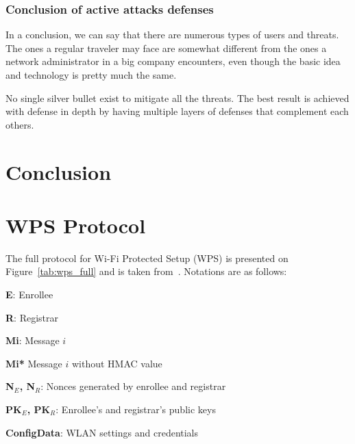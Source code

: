 \documentclass[12pt,a4paper,oneside,pdftex]{report}
\begin{document}
\subsection{Conclusion of active attacks defenses}

In a conclusion, we can say that there are numerous types of users and threats. The ones a regular traveler may face are somewhat different from the ones a network administrator in a big company encounters, even though the basic idea and technology is pretty much the same.

No single silver bullet exist to mitigate all the threats. The best result is achieved with defense in depth by having multiple layers of defenses that complement each others. 




\chapter{Conclusion}
\label{chapter:conclusion}


% 



\appendix
\chapter{WPS Protocol}
\label{chapter:appendix:wps}

The full protocol for Wi-Fi Protected Setup (WPS) is presented on Figure~\ref{tab:wps_full} and is taken from~\cite{microsoftWCN}. Notations are as follows:

\textbf{E}: Enrollee

\textbf{R}: Registrar

\textbf{Mi}: Message $i$

\textbf{Mi*} Message $i$ without HMAC value

\textbf{N$_E$, N$_R$}: Nonces generated by enrollee and registrar

\textbf{PK$_E$, PK$_R$}: Enrollee's and registrar's public keys

\textbf{ConfigData}: WLAN settings and credentials
\end{document}
